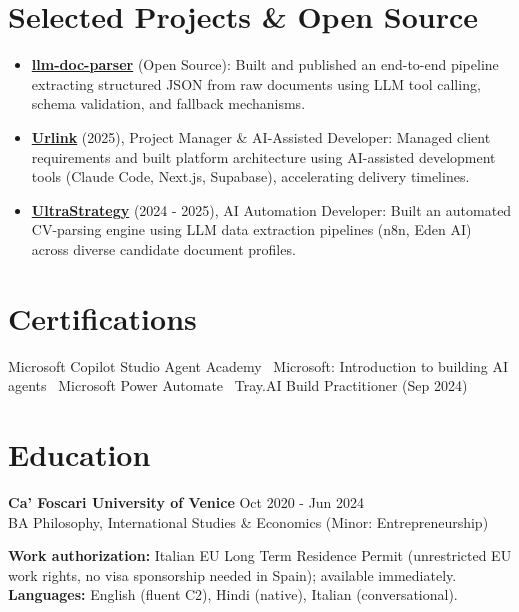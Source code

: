 \documentclass[a4paper,10pt]{article}
\begin{document}
\section{Selected Projects \& Open Source}
\begin{itemize}
 \item \textbf{\href{https://github.com/prab-gupta/llm-doc-parser}{llm-doc-parser}} (Open Source): Built and published an end-to-end pipeline extracting structured JSON from raw documents using LLM tool calling, schema validation, and fallback mechanisms.
 \item \textbf{\href{https://smarturlink.com/}{Urlink}} (2025), Project Manager \& AI-Assisted Developer: Managed client requirements and built platform architecture using AI-assisted development tools (Claude Code, Next.js, Supabase), accelerating delivery timelines.
 \item \textbf{\href{https://ultrastrategy.com}{UltraStrategy}} (2024 - 2025), AI Automation Developer: Built an automated CV-parsing engine using LLM data extraction pipelines (n8n, Eden AI) across diverse candidate document profiles.
\end{itemize}

\section{Certifications}
Microsoft Copilot Studio Agent Academy \textbullet\ Microsoft: Introduction to building AI agents \textbullet\ Microsoft Power Automate \textbullet\ Tray.AI Build Practitioner (Sep 2024)

\section{Education}
\textbf{Ca' Foscari University of Venice} \hfill Oct 2020 - Jun 2024\\
BA Philosophy, International Studies \& Economics (Minor: Entrepreneurship)

\vspace{2pt}
{\small \textbf{Work authorization:} Italian EU Long Term Residence Permit (unrestricted EU work rights, no visa sponsorship needed in Spain); available immediately. \quad \textbf{Languages:} English (fluent C2), Hindi (native), Italian (conversational).}
\end{document}
